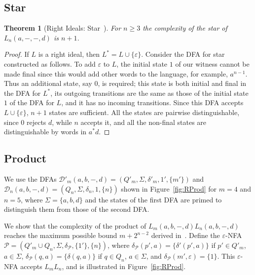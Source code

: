 \documentclass[final]{dmtcs-episciences}
\renewcommand{\ge}{\geqslant}
\newcommand{\eps}{\varepsilon}
\newcommand{\Sig}{\Sigma}
\newcommand{\cD}{{\mathcal D}}
\newcommand{\cP}{{\mathcal P}}
\newtheorem{theorem}{Theorem}
\theoremstyle{definition}
\theoremstyle{remark}
\begin{document}
\subsection{Star}
\begin{theorem}[Right Ideals: Star~\cite{BrDa14}]
\label{thm:RStar}
For $n \ge 3$ the complexity of the  star of $L_n(a,-,-,d)$ is $n+1$.
\end{theorem}
\begin{proof}
If $L$ is a right ideal, then $L^*=L\cup  \{\eps\} $.
Consider the DFA for star constructed as follows.
To add $\eps$ to $L$, 
the initial state $1$ of our witness cannot be made final since this would add other words to the language, for example, $a^{n-1}$.
Thus an additional state, say $0$, is required; this state is both initial and final in the DFA for $L^*$, its outgoing transitions are the same as those of the initial state $1$ of the DFA for $L$, and it has no incoming transitions. Since this DFA accepts $L\cup \{\eps\}$, $n+1$ states are sufficient. All the states are pairwise distinguishable, since $0$ rejects $d$, while $n$ accepts it, and all the non-final states are distinguishable by words in $a^*d$. 
\end{proof}


\subsection{Product}
\label{ssec:product_right}

We use the DFAs $\cD'_m(a,b,-,d)=(Q'_m,\Sig, \delta'_m,1',\{m'\})$ and $\cD_n(a,b,-,d)=(Q_n,\Sig, \delta_n,1,\{n\})$ shown in
Figure~\ref{fig:RProd} for $m=4$ and $n=5$, where $\Sig=\{a,b,d\}$ and the states of the first DFA are primed to distinguish them from those of the second DFA.

We show that the complexity of the product of $L_m(a,b,-,d)L_n(a,b,-,d)$ 
reaches the maximum possible bound $m+2^{n-2}$ derived in~\cite{BJL13}.
Define the $\eps$-NFA $\cP=(Q'_m\cup Q_n,\Sig, \delta_\cP,\{1'\},\{n\})$, 
where $\delta_\cP(p',a)=\{ \delta'(p',a)\}$ if $p'\in Q'_m$, $a\in\Sig$,
$\delta_\cP(q,a)=\{ \delta(q,a)\}$ if $q\in Q_n$, $a\in \Sig$, 
and $\delta_\cP(m',\eps)=\{1\}$.
This $\eps$-NFA accepts $L_mL_n$, and is illustrated in Figure~\ref{fig:RProd}.
\end{document}
